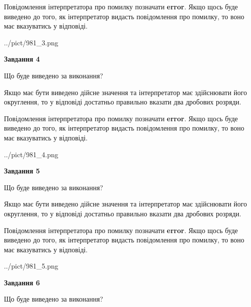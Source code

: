 \documentclass[12pt, ukrainian]{article}
\begin{document}
{\begin {Large}
Повідомлення інтерпретатора про помилку позначати \textbf{error}.
Якщо щось буде виведено до того, як інтерпретатор видасть повідомлення про помилку, 
то воно має вказуватись у відповіді. \par

\begin{center}
	{../pict/981_3.png}
\end{center}
\newpage

{\begin {center}\textbf{Завдання 4}\end {center}}\par
Що буде виведено за виконання? \par

Якщо має бути виведено дійсне значення та інтерпретатор має здійснювати його округлення, 
то у відповіді достатньо правильно вказати два дробових розряди.

Повідомлення інтерпретатора про помилку позначати \textbf{error}.
Якщо щось буде виведено до того, як інтерпретатор видасть повідомлення про помилку, 
то воно має вказуватись у відповіді. \par

\begin{center}
	{../pict/981_4.png}
\end{center}
\newpage

{\begin {center}\textbf{Завдання 5}\end {center}}\par
Що буде виведено за виконання? \par

Якщо має бути виведено дійсне значення та інтерпретатор має здійснювати його округлення, 
то у відповіді достатньо правильно вказати два дробових розряди.

Повідомлення інтерпретатора про помилку позначати \textbf{error}.
Якщо щось буде виведено до того, як інтерпретатор видасть повідомлення про помилку, 
то воно має вказуватись у відповіді. \par

\begin{center}
	{../pict/981_5.png}
\end{center}
\newpage

{\begin {center}\textbf{Завдання 6}\end {center}}\par
Що буде виведено за виконання? \par


\end{Large}}
\end{document}
